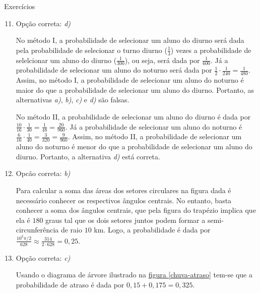 \begin{answer}{Exercícios}
{\exerciselist
\begin{enumerate}\setcounter{enumi}{10}
\item Opção correta: \textit{d)}

No método I, a probabilidade de selecionar um aluno do diurno será dada pela probabilidade de selecionar o turno diurno ($\frac{1}{3}$) vezes a probabilidade de selelcionar um aluno do diurno ($\frac{1}{300}$), ou seja, será dada por $\frac{1}{600}$. Já a probabilidade de selecionar um aluno do noturno será dada por $\frac{1}{2}\cdot\frac{1}{240}=\frac{1}{480}$. Assim, no método I, a probabilidade de selecionar um aluno do noturno é maior do que a probabilidade de selecionar um aluno do diurno. Portanto, as alternativas \textit{a)}, \textit{b)}, \textit{c)} e \textit{d)} são falsas.

No método II, a probabilidade de selecionar um aluno do diurno é dada por $\frac{10}{16}\cdot\frac{1}{30}=\frac{1}{48}=\frac{20}{960}$. Já a probabilidade de selecionar um aluno do noturno é $\frac{6}{16}\cdot\frac{1}{40}=\frac{3}{320}=\frac{9}{960}$. Assim, no método II, a probabilidade de selecionar um aluno do noturno é menor do que a probabilidade de selecionar um aluno do diurno. Portanto, a alternativa \textit{d)} está correta.

\item Opcão correta: \textit{b)}

Para calcular a soma das áreas dos setores circulares na figura dada é necessário conhecer os respectivos ângulos centrais. No entanto, basta conhecer a soma dos ângulos centrais, que pela figura do trapézio implica que ela é $180$ graus tal que os dois setores juntos podem formar a semi-circunferência de raio $10$ km. Logo, a probabilidade é dada por $\frac{10^2\pi/2}{628}\approx\frac{314}{2\cdot628}=0{,}25$.

\item Opção correta: \textit{c)}

Usando o diagrama de árvore ilustrado na \hyperref[chuva-atraso]{figura \ref{chuva-atraso}} tem-se que a probabilidade de atraso é dada por $0{,}15+0{,}175=0{,}325$.\textbf{}

\notas
{
\begin{figure}[H]
\centering

\resizebox{\linewidth}{!}
{
}
\end{figure}}
\end{enumerate}}
\end{answer}
